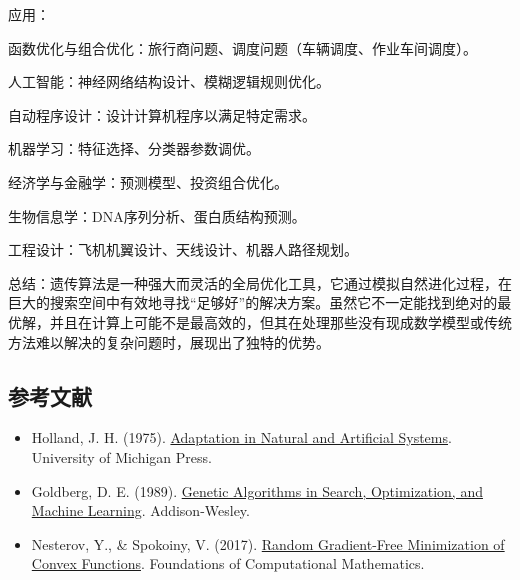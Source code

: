 应用：

函数优化与组合优化：旅行商问题、调度问题（车辆调度、作业车间调度）。

人工智能：神经网络结构设计、模糊逻辑规则优化。

自动程序设计：设计计算机程序以满足特定需求。

机器学习：特征选择、分类器参数调优。

经济学与金融学：预测模型、投资组合优化。

生物信息学：DNA序列分析、蛋白质结构预测。

工程设计：飞机机翼设计、天线设计、机器人路径规划。

总结：遗传算法是一种强大而灵活的全局优化工具，它通过模拟自然进化过程，在巨大的搜索空间中有效地寻找``足够好''的解决方案。虽然它不一定能找到绝对的最优解，并且在计算上可能不是最高效的，但其在处理那些没有现成数学模型或传统方法难以解决的复杂问题时，展现出了独特的优势。

\hypertarget{ux53c2ux8003ux6587ux732e-31}{%
\subsection{参考文献}\label{ux53c2ux8003ux6587ux732e-31}}

\vspace{0.25em}
\begin{itemize}
\tightlist
\item
  Holland, J. H. (1975). \href{https://openlibrary.org/books/OL5070129M/Adaptation_in_natural_and_artificial_systems}{Adaptation in Natural and Artificial Systems}. University of Michigan Press.
\item
  Goldberg, D. E. (1989). \href{https://openlibrary.org/books/OL2030750M/Genetic_algorithms_in_search_optimization_and_machine_learning}{Genetic Algorithms in Search, Optimization, and Machine Learning}. Addison-Wesley.
\item
  Nesterov, Y., \& Spokoiny, V. (2017). \href{https://doi.org/10.1007/s10208-015-9296-2}{Random Gradient-Free Minimization of Convex Functions}. Foundations of Computational Mathematics.
\end{itemize}

\clearpage
